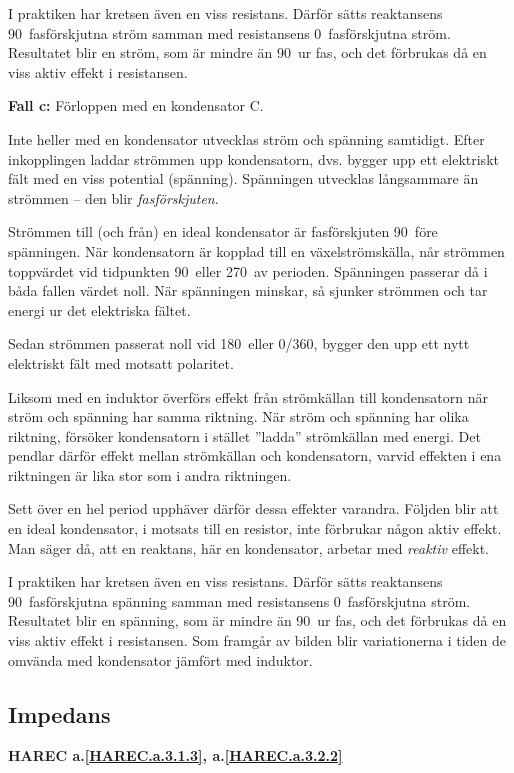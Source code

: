 I praktiken har kretsen även en viss resistans.
Därför sätts reaktansens 90\degree~fasförskjutna ström samman med resistansens
0\degree~fasförskjutna ström.
Resultatet blir en ström, som är mindre än 90\degree~ur fas, och det förbrukas
då en viss aktiv effekt i resistansen.

\textbf{Fall c:} Förloppen med en kondensator C.

Inte heller med en kondensator utvecklas ström och spänning samtidigt.
Efter inkopplingen laddar strömmen upp kondensatorn, dvs. bygger upp ett
elektriskt fält med en viss potential (spänning).
Spänningen utvecklas långsammare än strömmen -- den blir \emph{fasförskjuten}.

Strömmen till (och från) en ideal kondensator är fasförskjuten 90\degree~före
spänningen.
När kondensatorn är kopplad till en växelströmskälla, når strömmen toppvärdet
vid tidpunkten 90\degree~eller 270\degree~av perioden.
Spänningen passerar då i båda fallen värdet noll.
När spänningen minskar, så sjunker strömmen och tar energi ur det elektriska
fältet.

Sedan strömmen passerat noll vid 180\degree~eller 0\degree/360\degree, bygger
den upp ett nytt elektriskt fält med motsatt polaritet.

Liksom med en induktor överförs effekt från strömkällan till kondensatorn när
ström och spänning har samma riktning.
När ström och spänning har olika riktning, försöker kondensatorn i stället
''ladda'' strömkällan med energi.
Det pendlar därför effekt mellan strömkällan och kondensatorn, varvid effekten i
ena riktningen är lika stor som i andra riktningen.

Sett över en hel period upphäver därför dessa effekter varandra.
Följden blir att en ideal kondensator, i motsats till en resistor, inte
förbrukar någon aktiv effekt.
Man säger då, att en reaktans, här en kondensator, arbetar med \emph{reaktiv}
effekt.

I praktiken har kretsen även en viss resistans.
Därför sätts reaktansens 90\degree~fasförskjutna spänning samman med
resistansens 0\degree~fasförskjutna ström.
Resultatet blir en spänning, som är mindre än 90\degree~ur fas, och det
förbrukas då en viss aktiv effekt i resistansen.
Som framgår av bilden blir variationerna i tiden de omvända med kondensator
jämfört med induktor.

\subsection{Impedans}
\textbf{HAREC
  a.\ref{HAREC.a.3.1.3}\label{myHAREC.a.3.1.3c},
  a.\ref{HAREC.a.3.2.2}\label{myHAREC.a.3.2.2}
}

